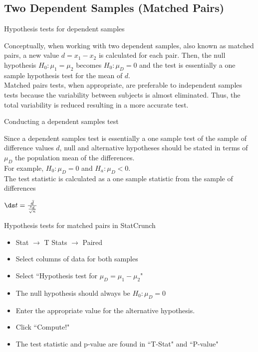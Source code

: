 \documentclass[xcolor=table]{beamer}
\begin{document}
\subsection{Two Dependent Samples (Matched Pairs)}

\begin{frame}{Hypothesis tests for dependent samples}
\begin{block}{}
\large
Conceptually, when working with two dependent samples, also known as matched pairs, a new value $d = x_1 - x_2$ is calculated for each pair. Then, the null hypothesis $H_0: \mu_1 = \mu_2$ becomes $H_0: \mu_D = 0$ and the test is essentially a one sample hypothesis test for the mean of $d$.\\
\pause\medskip
Matched pairs tests, when appropriate, are preferable to independent samples tests because the variability between subjects is almost eliminated. Thus, the total variability is reduced resulting in a more accurate test. 
\end{block}
\end{frame}

\begin{frame}{Conducting a dependent samples test}
\begin{block}{}
\large
Since a dependent samples test is essentially a one sample test of the sample of difference values $d$, null and alternative hypotheses should be stated in terms of $\mu_D$ the population mean of the differences.\\
\pause\medskip
For example, $H_0: \mu_D = 0$ and $H_a: \mu_D < 0$.\\
\pause\medskip
The test statistic is calculated as a one sample statistic from the sample of differences\\
\medskip
{\centering $\ds t = \frac {\bar d}{\frac{s_d}{\sqrt{n}}}$ \par}
\medskip
\end{block}
\end{frame}

\begin{frame}{Hypothesis tests for matched pairs in StatCrunch}

\begin{block}{}
\large
\begin{itemize}
\item Stat $\to$ T Stats $\to$ Paired
\item Select columns of data for both samples
\item Select ``Hypothesis test for $\mu_D = \mu_1 - \mu_2$"
\item The null hypothesis should always be $H_0: \mu_D = 0$
\item Enter the appropriate value for the alternative hypothesis.
\item Click ``Compute!"
\item The test statistic and p-value are found in ``T-Stat" and ``P-value"
\end{itemize}
\end{block}

\end{frame}
\end{document}
